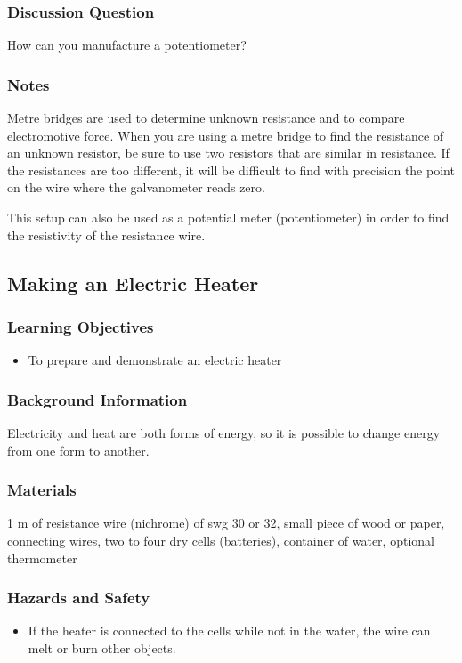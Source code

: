 \subsubsection*{Discussion Question}
How can you manufacture a potentiometer?

\subsubsection*{Notes}
Metre bridges are used to determine unknown resistance and to compare electromotive force.  When you are using a metre bridge to find the resistance of an unknown resistor, be sure to use two resistors that are similar in resistance. If the resistances are too different, it will be difficult to find with precision the point on the wire where the galvanometer reads zero.

This setup can also be used as a potential meter (potentiometer) in order to find the resistivity of the resistance wire.  


\subsection{Making an Electric Heater}

\subsubsection*{Learning Objectives}
\begin{itemize}
\item{To prepare and demonstrate an electric heater} 
\end{itemize}

\subsubsection*{Background Information}
Electricity and heat are both forms of energy, so it is possible to change energy from one form to another.  

\subsubsection*{Materials}
1 m of resistance wire (nichrome) of swg 30 or 32, small piece of wood or paper, connecting wires, two to four dry cells (batteries), container of water, optional thermometer

\subsubsection*{Hazards and Safety}
\begin{itemize}
\item{If the heater is connected to the cells while not in the water, the wire can melt or burn other objects.} 
\end{itemize}

